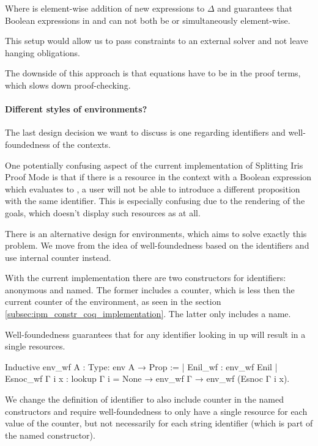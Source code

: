 Where \coqe{$\Delta$[bs1]} is element-wise addition of new expressions to \(\Delta\) and  guarantees that Boolean expressions in  and  can not both be \true or \false simultaneously element-wise.

This setup would allow us to pass constraints to an external solver and not leave hanging obligations.

The downside of this approach is that equations have to be in the proof terms, which slows down proof-checking.

\paragraph{Different styles of environments?}

The last design decision we want to discuss is one regarding identifiers and well-foundedness of the contexts.

One potentially confusing aspect of the current implementation of Splitting Iris Proof Mode is that if there is a resource  in the context with a Boolean expression which evaluates to \false, a user will not be able to introduce a different proposition with the same identifier.
This is especially confusing due to the rendering of the goals, which doesn't display such resources as  at all.

There is an alternative design for environments, which aims to solve exactly this problem.
We move from the idea of well-foundedness based on the identifiers and use internal counter instead.

With the current implementation there are two constructors for identifiers: anonymous and named.
The former includes a counter, which is less then the current counter of the environment, as seen in the section \ref{subsec:ipm_constr_coq_implementation}.
The latter only includes a name.

Well-foundedness guarantees that for any identifier looking in up will result in a single resources.
\begin{coq}
  Inductive env_wf {A : Type}: env A → Prop :=
  | Enil_wf : env_wf Enil
  | Esnoc_wf Γ i x : lookup Γ i = None → env_wf Γ → env_wf (Esnoc Γ i x).
\end{coq}

We change the definition of identifier to also include counter in the named constructors and require well-foundedness to only have a single resource for each value of the counter, but not necessarily for each string identifier (which is part of the named constructor).

